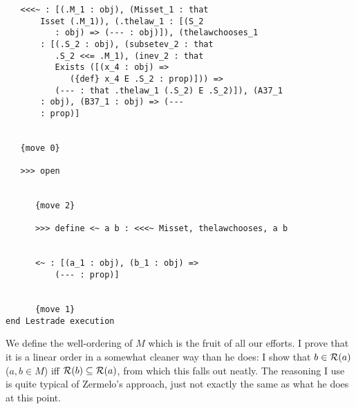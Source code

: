 \documentclass[12pt]{article}
\begin{document}
\begin{verbatim}
   <<<~ : [(.M_1 : obj), (Misset_1 : that 
       Isset (.M_1)), (.thelaw_1 : [(S_2 
          : obj) => (--- : obj)]), (thelawchooses_1 
       : [(.S_2 : obj), (subsetev_2 : that 
          .S_2 <<= .M_1), (inev_2 : that 
          Exists ([(x_4 : obj) => 
             ({def} x_4 E .S_2 : prop)])) => 
          (--- : that .thelaw_1 (.S_2) E .S_2)]), (A37_1 
       : obj), (B37_1 : obj) => (--- 
       : prop)]


   {move 0}

   >>> open


      {move 2}

      >>> define <~ a b : <<<~ Misset, thelawchooses, a b


      <~ : [(a_1 : obj), (b_1 : obj) => 
          (--- : prop)]


      {move 1}
end Lestrade execution
\end{verbatim}

We define the well-ordering of $M$ which is the fruit of all our efforts.  I prove that it is a linear order in a somewhat cleaner way than he does:
I show that $b \in {\cal R}(a)$ ($a,b \in M$) iff ${\cal R}(b) \subseteq {\cal R}(a)$, from which this falls out neatly.  The reasoning I use is quite typical of Zermelo's approach, just not exactly the same as what he does at this point.
\end{document}
